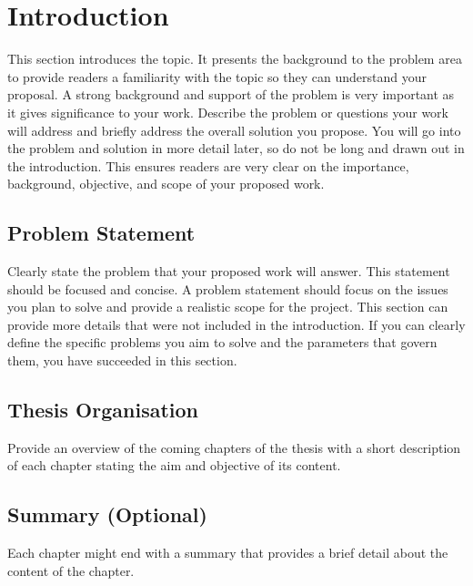 
\chapter{Introduction}

\begin{justify}
This section introduces the topic.  It presents the background to the problem area to provide readers a familiarity with the topic so they can understand your proposal.  A strong background and support of the problem is very important as it gives significance to your work.  Describe the problem or questions your work will address and briefly address the overall solution you propose.  You will go into the problem and solution in more detail later, so do not be long and drawn out in the introduction.  This ensures readers are very clear on the importance, background, objective, and scope of your proposed work.
\end{justify}

\section{Problem Statement}
\begin{justify}
Clearly state the problem that your proposed work will answer.  This statement should be focused and concise.  A problem statement should focus on the issues you plan to solve and provide a realistic scope for the project.  This section can provide more details that were not included in the introduction.  If you can clearly define the specific problems you aim to solve and the parameters that govern them, you have succeeded in this section.
\end{justify}

\section{Thesis Organisation}
\begin{justify}
Provide an overview of the coming chapters of the thesis with a short description of each chapter stating the aim and objective of its content.
\end{justify}

\section{Summary (Optional)}
\begin{justify}
Each chapter might end with a summary that provides a brief detail about the content of the chapter.
\end{justify}

\clearpage
